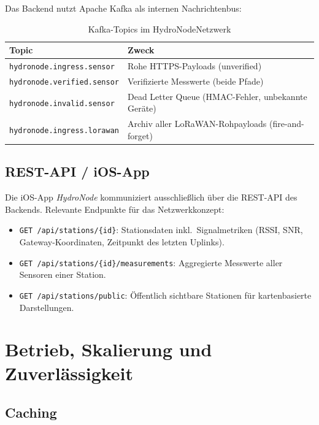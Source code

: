 Das Backend nutzt Apache Kafka als internen Nachrichtenbus:

\begin{table}[h]
  \centering
  \begin{tabular}{ll}
    \hline
    \textbf{Topic} & \textbf{Zweck} \\
    \hline
    \texttt{hydronode.ingress.sensor}    & Rohe HTTPS-Payloads (unverified) \\
    \texttt{hydronode.verified.sensor}   & Verifizierte Messwerte (beide Pfade) \\
    \texttt{hydronode.invalid.sensor}    & Dead Letter Queue (HMAC-Fehler, unbekannte Geräte) \\
    \texttt{hydronode.ingress.lorawan}   & Archiv aller LoRaWAN-Rohpayloads (fire-and-forget) \\
    \hline
  \end{tabular}
  \caption{Kafka-Topics im HydroNodeNetzwerk}
  \label{tab:kafka-topics}
\end{table}

\subsection*{REST-API / iOS-App}

Die iOS-App \textit{HydroNode} kommuniziert ausschließlich über die REST-API des Backends.
Relevante Endpunkte für das Netzwerkkonzept:

\begin{itemize}
  \item \texttt{GET /api/stations/\{id\}}: Stationsdaten inkl.\ Signalmetriken (RSSI, SNR,
        Gateway-Koordinaten, Zeitpunkt des letzten Uplinks).
  \item \texttt{GET /api/stations/\{id\}/measurements}: Aggregierte Messwerte aller
        Sensoren einer Station.
  \item \texttt{GET /api/stations/public}: Öffentlich sichtbare Stationen für
        kartenbasierte Darstellungen.
\end{itemize}

\newpage

\section*{Betrieb, Skalierung und Zuverlässigkeit}

\subsection*{Caching}

